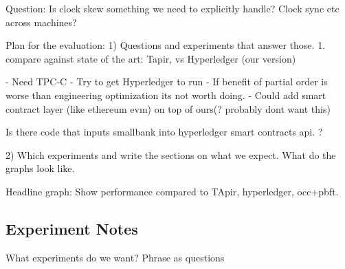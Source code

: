 Question: Is clock skew something we need to explicitly handle? Clock sync etc across machines?

Plan for the evaluation:
1) Questions and experiments that answer those.
  1. compare against state of the art: Tapir, vs Hyperledger (our version)
  

- Need TPC-C
- Try to get Hyperledger to run
- If benefit of partial order is worse than engineering optimization its not worth doing. 
- Could add smart contract layer (like ethereum evm) on top of ours(? probably dont want this)

Is there code that inputs smallbank into hyperledger smart contracts api. ?


2) Which experiments and write the sections on what we expect. What do the graphs look like.


Headline graph: Show performance compared to TApir, hyperledger, occ+pbft.

\subsection{Experiment Notes}
What experiments do we want? Phrase as questions

